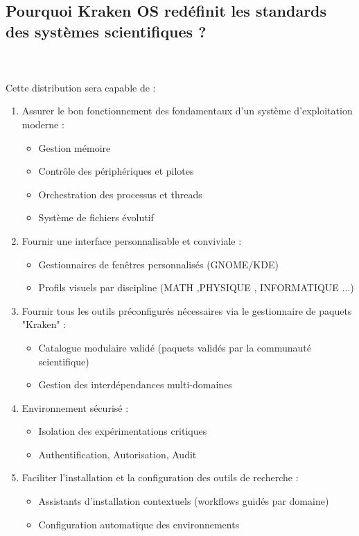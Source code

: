 \begin{itemize}[leftmargin=*,nosep]
 \subsection{ Pourquoi Kraken OS redéfinit les standards des systèmes scientifiques ?} \\ \\
Cette distribution sera capable de :
\begin{enumerate}[label=\alph*)]
\item Assurer le bon fonctionnement des fondamentaux d’un système d’exploitation moderne :
\begin{itemize}
\item Gestion mémoire 
\item Contrôle des périphériques et pilotes
\item Orchestration des processus et threads
\item Système de fichiers évolutif
\end{itemize}

\item Fournir une interface personnalisable et conviviale  :
\begin{itemize}
\item Gestionnaires de fenêtres personnalisés (GNOME/KDE)
\item Profils visuels par discipline (MATH ,PHYSIQUE , INFORMATIQUE ...)
\end{itemize}

\item Fournir tous les outils préconfigurés nécessaires via le gestionnaire de paquets "Kraken" :
\begin{itemize}
\item Catalogue modulaire validé (paquets validés par la communauté scientifique)
\item Gestion des interdépendances multi-domaines
\end{itemize}

\item Environnement sécurisé :
\begin{itemize}
\item Isolation des expérimentations critiques
\item Authentification, Autorisation, Audit
\end{itemize}

\item Faciliter l’installation et la configuration des outils de recherche : 
\begin{itemize}
\item Assistants d'installation contextuels (workflows guidés par domaine)
\item Configuration automatique des environnements
\end{itemize}


\end{enumerate}
\end{itemize}
